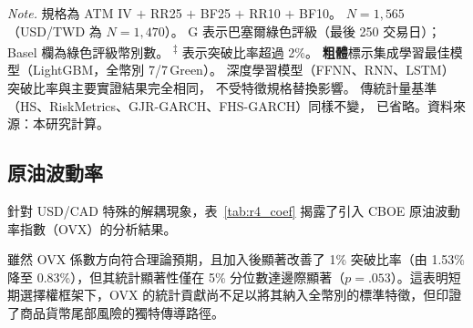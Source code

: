\begin{table}[htbp]
    \vspace{2mm}

    \begin{minipage}{\textwidth}
        \fontsize{9pt}{13pt}\selectfont
        \textit{Note.} 規格為 ATM IV $+$ RR25 $+$ BF25 $+$ RR10 $+$ BF10。%
        $N = 1{,}565$（USD/TWD 為 $N = 1{,}470$）。%
        G 表示巴塞爾綠色評級（最後 250 交易日）；Basel 欄為綠色評級幣別數。%
        \textsuperscript{$\ddagger$} 表示突破比率超過 2\%。%
        \textbf{粗體}標示集成學習最佳模型（LightGBM，全幣別 7/7\,Green）。%
        深度學習模型（FFNN、RNN、LSTM）突破比率與主要實證結果完全相同，%
        不受特徵規格替換影響。%
        傳統計量基準（HS、RiskMetrics、GJR-GARCH、FHS-GARCH）同樣不變，%
        已省略。資料來源：本研究計算。
    \end{minipage}
\end{table}

\subsection{原油波動率}
\label{subsec:r4_ovx}

針對 USD/CAD 特殊的解耦現象，表~\ref{tab:r4_coef} 揭露了引入 CBOE 原油波動率指數（OVX）的分析結果。

雖然 OVX 係數方向符合理論預期，且加入後顯著改善了 1\% 突破比率（由 1.53\% 降至 0.83\%），但其統計顯著性僅在 5\% 分位數達邊際顯著（$p = .053$）。這表明短期選擇權框架下，OVX 的統計貢獻尚不足以將其納入全幣別的標準特徵，但印證了商品貨幣尾部風險的獨特傳導路徑。

